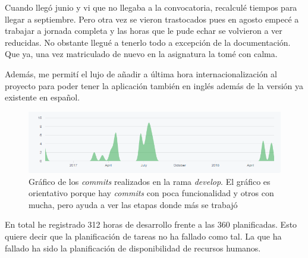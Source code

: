 Cuando llegó junio y vi que no llegaba a la convocatoria, recalculé tiempos para llegar a septiembre. Pero otra vez se vieron trastocados pues en agosto empecé a trabajar a jornada completa y las horas que le pude echar se volvieron a ver reducidas. No obstante llegué a tenerlo todo a excepción de la documentación. Que ya, una vez matriculado de nuevo en la asignatura la tomé con calma.

Además, me permití el lujo de añadir a última hora internacionalización al proyecto para poder tener la aplicación también en inglés además de la versión ya existente en español.

\begin{figure}[H]
	\centering
	\includegraphics[width=12cm]{imagenes/planificacion/resultados}
	\caption{Gráfico de los \textit{commits} realizados en la rama \textit{develop}. El gráfico es orientativo porque hay \textit{commits} con poca funcionalidad y otros con mucha, pero ayuda a ver las etapas donde más se trabajó}
	\label{fig:planificacion/resultados}
\end{figure}

En total he registrado 312 horas de desarrollo frente a las 360 planificadas. Esto quiere decir que la planificación de tareas no ha fallado como tal. La que ha fallado ha sido la planificación de disponibilidad de recursos humanos.
